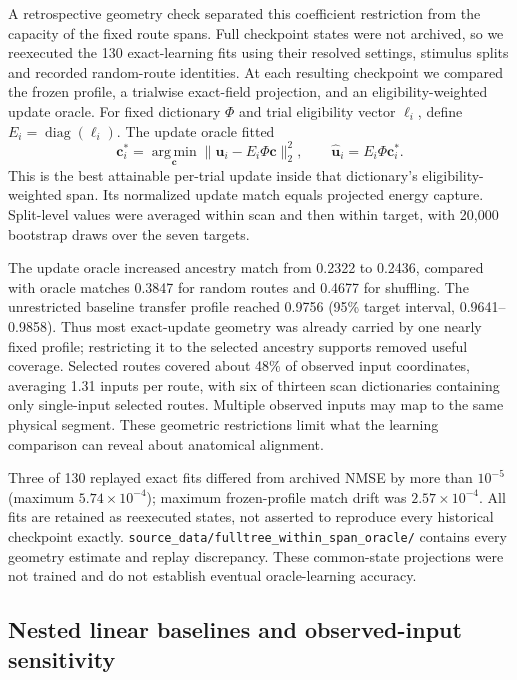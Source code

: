 A retrospective geometry check separated this coefficient restriction from
the capacity of the fixed route spans. Full checkpoint states were not
archived, so we reexecuted the 130 exact-learning fits using their resolved
settings, stimulus splits and recorded random-route identities. At each
resulting checkpoint we compared the frozen profile, a trialwise exact-field
projection, and an eligibility-weighted update oracle. For fixed dictionary $\Phi$ and trial eligibility vector $\bm\ell_i$, define
$E_i=\operatorname{diag}(\bm\ell_i)$. The update oracle fitted
\[
\bm c_i^*=\operatorname*{arg\,min}_{\bm c}
\lVert\bm u_i-E_i\Phi\bm c\rVert_2^2,
\qquad \widehat{\bm u}_i=E_i\Phi\bm c_i^* .
\]
This is the best attainable per-trial update inside that dictionary's
eligibility-weighted span. Its normalized update match equals projected
energy capture. Split-level values were averaged within scan and then within
target, with 20,000 bootstrap draws over the seven targets.

The update oracle increased ancestry match from 0.2322 to 0.2436, compared with oracle matches 0.3847 for random routes and 0.4677 for shuffling. The unrestricted baseline transfer profile reached 0.9756 (95\% target interval, 0.9641--0.9858). Thus most exact-update geometry was already carried by one nearly fixed profile; restricting it to the selected ancestry supports removed useful coverage. Selected routes covered about 48\% of observed input coordinates, averaging 1.31 inputs per route, with six of thirteen scan dictionaries containing only single-input selected routes. Multiple observed inputs may map to the same physical segment. These geometric restrictions limit what the learning comparison can reveal about anatomical alignment.

Three of 130 replayed exact fits differed from archived NMSE by more than $10^{-5}$ (maximum $5.74\times10^{-4}$); maximum frozen-profile match drift was $2.57\times10^{-4}$. All fits are retained as reexecuted states, not asserted to reproduce every historical checkpoint exactly. \texttt{source\_data/fulltree\_within\_span\_oracle/} contains every geometry estimate and replay discrepancy. These common-state projections were not trained and do not establish eventual oracle-learning accuracy.

\subsection{Nested linear baselines and observed-input sensitivity}
\label{note:response_baselines}

